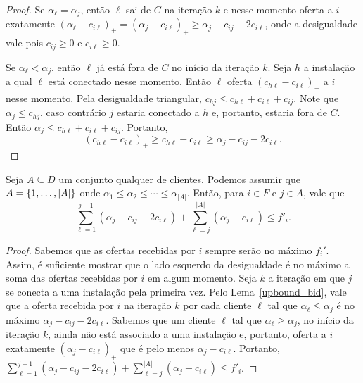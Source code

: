 \begin{proof}
Se $\alpha_\ell = \alpha_j$, então $\ell$ sai de $C$ na iteração $k$ e nesse momento oferta a $i$ exatamente $(\alpha_\ell - c_{i\ell})_+ = (\alpha_j - c_{i\ell})_+ \geq \alpha_j - c_{ij} - 2c_{i\ell}$, onde a desigualdade vale pois $c_{ij}\geq 0$ e $c_{i\ell} \geq 0$.

Se $\alpha_\ell < \alpha_j $, então $\ell$ já está fora de $C$ no início da iteração $k$. 
Seja $h$ a instalação a qual $\ell$ está conectado nesse momento. 
Então $\ell$ oferta $(c_{h\ell} - c_{i\ell})_+$ a $i$ nesse momento. 
Pela desigualdade triangular, $c_{hj} \leq c_{h\ell} + c_{i\ell} + c_{ij}$. 
Note que $\alpha_j \leq c_{hj}$, caso contrário $j$ estaria conectado a $h$ e, portanto, estaria fora de $C$. Então $\alpha_j \leq c_{h\ell} + c_{i\ell } + c_{ij} $. 
Portanto,
\[ (c_{h\ell} - c_{i\ell})_+ \geq c_{h\ell} - c_{i\ell} \geq \alpha_j - c_{ij} - 2c_{i\ell}.\]
\end{proof}
\begin{lemma}
\label{lowerbound_fcost}
Seja $A \subseteq D$ um conjunto qualquer de clientes. Podemos assumir que $A = \{1,\ldots,|A|\}$ onde $\alpha_1 \leq \alpha_2 \leq \cdots \leq \alpha_{|A|}$. Então, para $i \in F$ e $j \in A$, vale que
\[ \sum_{\ell=1}^{j-1}(\alpha_j - c_{ij} - 2c_{i\ell}) + \sum_{\ell= j}^{|A|}(\alpha_j - c_{i\ell}) \leq f'_i.
\]
\end{lemma}
\begin{proof}
Sabemos que as ofertas recebidas por $i$ sempre serão no máximo $f_i'$. Assim, é suficiente mostrar que o lado esquerdo da desigualdade é no máximo a soma das ofertas recebidas por $i$ em algum momento. Seja $k$ a iteração em que $j$ se conecta a uma instalação pela primeira vez. Pelo Lema~\ref{upbound_bid}, vale que a oferta recebida por $i$ na iteração $k$ por cada cliente $\ell$ tal que $\alpha_\ell \leq \alpha_j$ é no máximo $\alpha_j - c_{ij} - 2c_{i\ell}$. Sabemos que um cliente $\ell$ tal que $\alpha_\ell \geq \alpha_j$, no início da iteração $k$, ainda não está associado a uma instalação e, 
portanto, oferta a $i$ exatamente $(\alpha_j - c_{i\ell})_+$  que é pelo menos $\alpha_j - c_{i\ell}$. Portanto, $\sum_{\ell=1}^{j-1}(\alpha_j - c_{ij} - 2c_{i\ell}) + \sum_{\ell= j}^{|A|}(\alpha_j - c_{i\ell}) \leq f'_i$.
\end{proof}


